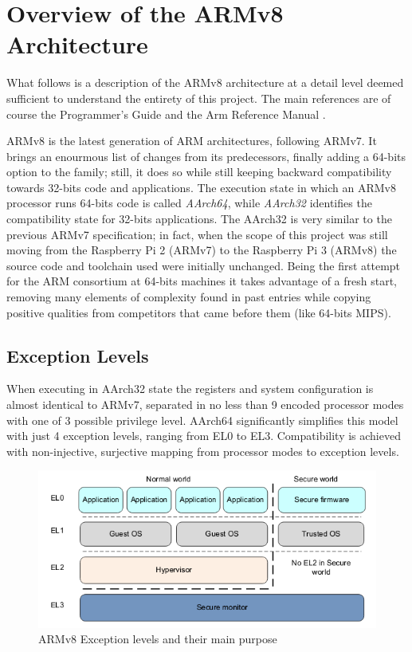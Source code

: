\documentclass[12pt,a4paper,openright,twoside]{report}
\begin{document}
\clearpage{\pagestyle{empty}\cleardoublepage}
\chapter{Overview of the ARMv8 Architecture}
What follows is a description of the ARMv8 architecture at a detail level deemed
sufficient to understand the entirety of this project. The main references are 
of course the Programmer's Guide \cite{guide} and the Arm Reference Manual \cite{armarm}.

ARMv8 is the latest generation of ARM architectures, following ARMv7. It brings
an enourmous list of changes from its predecessors, finally adding a 64-bits option
to the family; still, it does so while still keeping backward compatibility towards 32-bits
code and applications. The execution state in which an ARMv8 processor runs 64-bits
code is called \textit{AArch64}, while \textit{AArch32} identifies the compatibility
state for 32-bits applications.
The AArch32 is very similar to the previous ARMv7 specification; in fact, when 
the scope of this project was still moving from the Raspberry Pi 2 (ARMv7) to the
Raspberry Pi 3 (ARMv8) the source code and toolchain used were initially unchanged.
Being the first attempt for the ARM consortium at 64-bits machines it takes advantage
of a fresh start, removing many elements of complexity found in past entries while
copying positive qualities from competitors that came before them (like 64-bits MIPS).

\section{Exception Levels}
When executing in AArch32 state the registers and system configuration is almost
identical to ARMv7, separated in no less than 9 encoded processor modes with one
of 3 possible privilege level. AArch64 significantly simplifies this model with
just 4 exception levels, ranging from EL0 to EL3. Compatibility is achieved with 
non-injective, surjective mapping from processor modes to exception levels.

\begin{figure}[t]
    \begin{center}
\includegraphics[scale=0.6]{images/tesi7.png}
\caption[ARMv8 Exception Levels]{ARMv8 Exception levels and their main purpose}\label{fig:armv8el}
    \end{center}
\end{figure}
\end{document}
